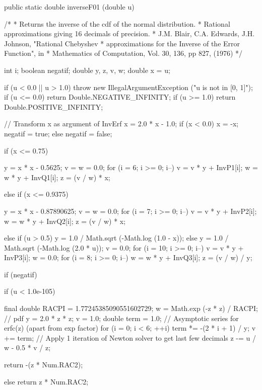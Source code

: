 \begin{code}
   public static double inverseF01 (double u)\begin{hide} {
       /*
        * Returns the inverse of the cdf of the normal distribution.
        * Rational approximations giving 16 decimals of precision.
        * J.M. Blair, C.A. Edwards, J.H. Johnson, "Rational Chebyshev
        * approximations for the Inverse of the Error Function", in
        * Mathematics of Computation, Vol. 30, 136, pp 827, (1976)
        */

      int i;
      boolean negatif;
      double y, z, v, w;
      double x = u;

      if (u < 0.0 || u > 1.0)
         throw new IllegalArgumentException ("u is not in [0, 1]");
      if (u <= 0.0)
         return Double.NEGATIVE_INFINITY;
      if (u >= 1.0)
         return Double.POSITIVE_INFINITY;

      // Transform x as argument of InvErf
      x = 2.0 * x - 1.0;
      if (x < 0.0) {
         x = -x;
         negatif = true;
      } else {
         negatif = false;
      }

      if (x <= 0.75) {
         y = x * x - 0.5625;
         v = w = 0.0;
         for (i = 6; i >= 0; i--) {
            v = v * y + InvP1[i];
            w = w * y + InvQ1[i];
         }
         z = (v / w) * x;

      } else if (x <= 0.9375) {
         y = x * x - 0.87890625;
         v = w = 0.0;
         for (i = 7; i >= 0; i--) {
            v = v * y + InvP2[i];
            w = w * y + InvQ2[i];
         }
         z = (v / w) * x;

      } else {
         if (u > 0.5)
            y = 1.0 / Math.sqrt (-Math.log (1.0 - x));
         else
            y = 1.0 / Math.sqrt (-Math.log (2.0 * u));
         v = 0.0;
         for (i = 10; i >= 0; i--)
            v = v * y + InvP3[i];
         w = 0.0;
         for (i = 8; i >= 0; i--)
            w = w * y + InvQ3[i];
         z = (v / w) / y;
      }

      if (negatif) {
         if (u < 1.0e-105) {
            final double RACPI = 1.77245385090551602729;
            w = Math.exp (-z * z) / RACPI;  // pdf
            y = 2.0 * z * z;
            v = 1.0;
            double term = 1.0;
            // Asymptotic series for erfc(z) (apart from exp factor)
            for (i = 0; i < 6; ++i) {
               term *= -(2 * i + 1) / y;
               v += term;
            }
            // Apply 1 iteration of Newton solver to get last few decimals
            z -= u / w - 0.5 * v / z;

         }
         return -(z * Num.RAC2);

      } else
         return z * Num.RAC2;
   }\end{hide}
\end{code}
